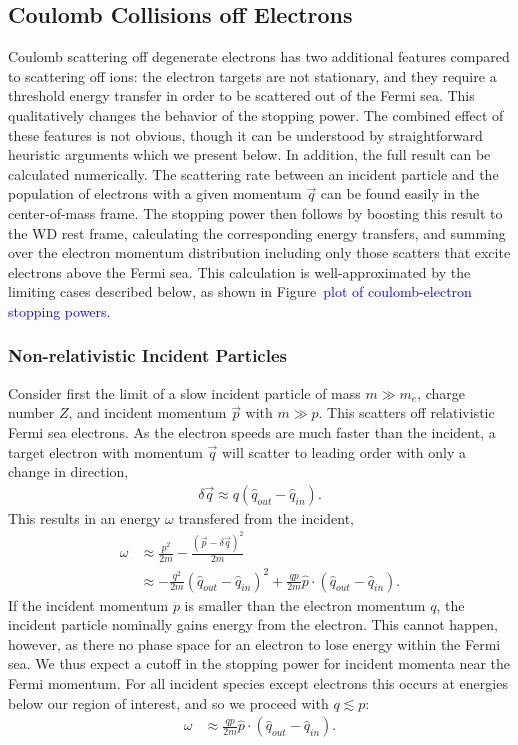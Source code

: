 \documentclass[twocolumn, preprintnumbers,amsmath,amssymb,prd, superscriptaddress]{revtex4}
\begin{document}
\begin{appendices}
\subsection{Coulomb Collisions off Electrons}

Coulomb scattering off degenerate electrons has two additional features compared to scattering off ions: the electron targets are not stationary, and they require a threshold energy transfer in order to be scattered out of the Fermi sea.
This qualitatively changes the behavior of the stopping power.
The combined effect of these features is not obvious, though it can be understood by straightforward heuristic arguments which we present below.
In addition, the full result can be calculated numerically.
The scattering rate between an incident particle and the population of electrons with a given momentum $\vec{q}$ can be found easily in the center-of-mass frame.
The stopping power then follows by boosting this result to the WD rest frame, calculating the corresponding energy transfers, and summing over the electron momentum distribution including only those scatters that excite electrons above the Fermi sea.
This calculation is well-approximated by the limiting cases described below, as shown in Figure~\textcolor{blue}{plot of coulomb-electron stopping powers}.

\subsubsection{Non-relativistic Incident Particles}
Consider first the limit of a slow incident particle of mass $m \gg m_e$, charge number $Z$, and incident momentum $\vec{p}$ with $m \gg p$.
This scatters off relativistic Fermi sea electrons.
As the electron speeds are much faster than the incident, a target electron with momentum $\vec{q}$ will scatter to leading order with only a change in direction,
\begin{align}
  \delta \vec{q} \approx q \left(\hat{q}_{out} - \hat{q}_{in}\right).
\end{align}
This results in an energy $\omega$ transfered from the incident,
\begin{align}
  \omega &\approx \frac{p^2}{2 m} -
    \frac{\left(\vec{p} - \delta \vec{q}\right)^2}{2 m} \\
    &\approx -\frac{q^2}{2m}  \left(\hat{q}_{out} - \hat{q}_{in}\right)^2
  + \frac{q p}{2m} \hat{p} \cdot \left(\hat{q}_{out} - \hat{q}_{in}\right).
\end{align}
If the incident momentum $p$ is smaller than the electron momentum $q$, the incident particle nominally gains energy from the electron.
This cannot happen, however, as there no phase space for an electron to lose energy within the Fermi sea.
We thus expect a cutoff in the stopping power for incident momenta near the Fermi momentum.
For all incident species except electrons this occurs at energies below our region of interest, and so we proceed with $q \lesssim p$:
\begin{align}
  \omega &\approx \frac{q p}{2m}
  \hat{p} \cdot \left(\hat{q}_{out} - \hat{q}_{in}\right).
\end{align}


\end{appendices}
\end{document}
